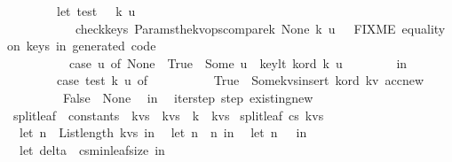 \begin{isabellebody}
\ \ \ \ \ \ \ \ let\ test\ {\isacharequal}\ {\isacharpercent}\ k\ u{\isachardot}\isanewline
\ \ \ \ \ \ \ \ \ \ {\isacharparenleft}{\isacharasterisk}\ {\isacharparenleft}check{\isacharunderscore}keys\ {\isacharparenleft}Params{\isachardot}the{\isacharunderscore}kv{\isacharunderscore}ops{\isacharbar}{\isachargreater}compare{\isacharunderscore}k{\isacharparenright}\ None\ {\isacharbraceleft}k{\isacharbraceright}\ u{\isacharparenright}\ {\isacharasterisk}{\isacharparenright}\ {\isacharparenleft}{\isacharasterisk}\ FIXME\ equality\ on\ keys\ in\ generated\ code\ {\isacharcolon}{\isacharparenleft}\ {\isacharasterisk}{\isacharparenright}\isanewline
\ \ \ \ \ \ \ \ \ \ case\ u\ of\ None\ {\isasymRightarrow}\ True\ {\isacharbar}\ Some\ u\ {\isasymRightarrow}\ key{\isacharunderscore}lt\ k{\isacharunderscore}ord\ k\ u\isanewline
\ \ \ \ \ \ \ \ in\isanewline
\ \ \ \ \ \ \ \ case\ test\ k\ u\ of\ \ \isanewline
\ \ \ \ \ \ \ \ True\ {\isasymRightarrow}\ {\isacharparenleft}Some{\isacharparenleft}kvs{\isacharunderscore}insert\ k{\isacharunderscore}ord\ {\isacharparenleft}k{\isacharcomma}v{\isacharparenright}\ acc{\isacharcomma}new{\isacharprime}{\isacharprime}{\isacharparenright}{\isacharparenright}\isanewline
\ \ \ \ \ \ \ \ {\isacharbar}\ False\ {\isasymRightarrow}\ {\isacharparenleft}None{\isacharparenright}{\isacharparenright}{\isacharparenright}{\isacharparenright}\isanewline
\ \ in\isanewline
\ \ iter{\isacharunderscore}step\ step\ {\isacharparenleft}existing{\isacharcomma}new{\isacharparenright}{\isacharparenright}{\isachardoublequoteclose}\isanewline
\isanewline
\isanewline
\isanewline
{}\isamarkupfalse%
\ split{\isacharunderscore}leaf\ {\isacharcolon}{\isacharcolon}\ {\isachardoublequoteopen}constants\ {\isasymRightarrow}\ {\isacharparenleft}{\isacharprime}k{\isacharasterisk}{\isacharprime}v{\isacharparenright}s\ {\isasymRightarrow}\ {\isacharparenleft}{\isacharprime}k{\isacharasterisk}{\isacharprime}v{\isacharparenright}s\ {\isacharasterisk}\ {\isacharprime}k\ {\isacharasterisk}\ {\isacharparenleft}{\isacharprime}k{\isacharasterisk}{\isacharprime}v{\isacharparenright}s{\isachardoublequoteclose}\ \isanewline
{\isachardoublequoteopen}split{\isacharunderscore}leaf\ cs{}\ kvs\ {\isacharequal}\ {\isacharparenleft}\isanewline
\ \ let\ n\ {\isacharequal}\ List{\isachardot}length\ kvs\ in\isanewline
\ \ let\ n{}\ {\isacharequal}\ n\ in\isanewline
\ \ let\ n{}\ {\isacharequal}\ {}\ in\isanewline
\ \ let\ delta\ {\isacharequal}\ cs{}{\isacharbar}{\isachargreater}min{\isacharunderscore}leaf{\isacharunderscore}size\ in\isanewline

\end{isabellebody}
